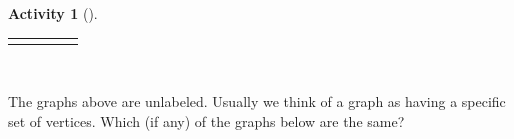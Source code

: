 \documentclass[10pt,]{book}
\theoremstyle{plain}
\theoremstyle{definition}
\theoremstyle{definition}
\theoremstyle{definition}
\newtheorem{activity}[project]{Activity}
\numberwithin{equation}{chapter}
\newlength{\panelmax}
\newcommand{\vtx}[2]{node[fill,circle,inner sep=0pt, minimum size=4pt,label=#1:#2]{}}
\renewcommand{\v}{\vtx{above}{}}
\begin{document}
\begin{activity}[]
{\begin{lrbox}{\panelboxEimage}
{{
}
}\end{lrbox}
\ifdefined\phEimage\else\newlength{\phEimage}\fi%
\setlength{\phEimage}{\ht\panelboxEimage+\dp\panelboxEimage}
\settototalheight{\phEimage}{\usebox{\panelboxEimage}}
\setlength{\panelmax}{\maxof{\panelmax}{\phEimage}}
\leavevmode%
\setlength{\tabcolsep}{0.01\linewidth}
\par\medskip\noindent
\hspace*{0.01\linewidth}%
\begin{tabular}{@{}*{5}{c}@{}}
\begin{minipage}[c][\panelmax][b]{0.18\linewidth}\usebox{\panelboxAimage}\end{minipage}&
\begin{minipage}[c][\panelmax][b]{0.18\linewidth}\usebox{\panelboxBimage}\end{minipage}&
\begin{minipage}[c][\panelmax][b]{0.18\linewidth}\usebox{\panelboxCimage}\end{minipage}&
\begin{minipage}[c][\panelmax][b]{0.18\linewidth}\usebox{\panelboxDimage}\end{minipage}&
\begin{minipage}[c][\panelmax][b]{0.18\linewidth}\usebox{\panelboxEimage}\end{minipage}\end{tabular}\\
}%
\par
\hypertarget{p-25}{}%
The graphs above are unlabeled. Usually we think of a graph as having a specific set of vertices. Which (if any) of the graphs below are the same?%
{%
\setlength{\panelmax}{0pt}
\ifdefined\panelboxAimage\else\newsavebox{\panelboxAimage}\fi%
\begin{lrbox}{\panelboxAimage}
\end{lrbox}}
\end{activity}
\end{document}
